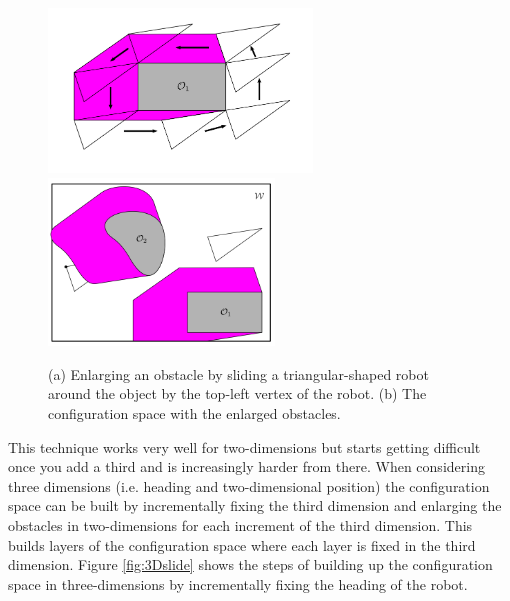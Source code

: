 \documentclass[twoside]{article}
\begin{document}
\begin{figure}[h!]
  \centering
  \includegraphics[width=70mm]{SlideRobot.PNG}\includegraphics[width=60mm]{SlideRobot2.PNG}
  \caption{(a) Enlarging an obstacle by sliding a triangular-shaped robot around the object by the top-left vertex of the robot. (b) The configuration space with the enlarged obstacles.}
  \label{fig:2Dslide}
\end{figure}

This technique works very well for two-dimensions but starts getting difficult once you add a third and is increasingly harder from there. When considering three dimensions (i.e. heading and two-dimensional position) the configuration space can be built by incrementally fixing the third dimension and enlarging the obstacles in two-dimensions for each increment of the third dimension. This builds layers of the configuration space where each layer is fixed in the third dimension. Figure \ref{fig:3Dslide} shows the steps of building up the configuration space in three-dimensions by incrementally fixing the heading of the robot.
\end{document}
